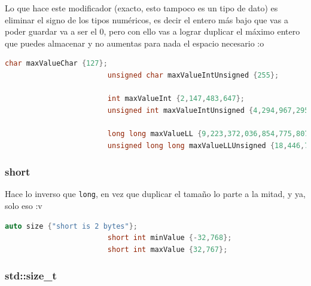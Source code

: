\documentclass[12pt, fleqn]{report}                             %
\theoremstyle{break}                                            %
\begin{document}
                    Lo que hace este modificador (exacto, esto tampoco es un tipo de dato)
                    es eliminar el signo de los tipos numéricos, es decir el entero más bajo que vas
                    a poder guardar va a ser el 0, pero con ello vas a lograr duplicar
                    el máximo entero que puedes almacenar y no aumentas para nada el espacio necesario :o
                    \begin{lstlisting}[language=C++, gobble=24]
                        char maxValueChar {127};                    
                        unsigned char maxValueIntUnsigned {255};
                        
                        int maxValueInt {2,147,483,647};                    
                        unsigned int maxValueIntUnsigned {4,294,967,295};
                        
                        long long maxValueLL {9,223,372,036,854,775,807};                    
                        unsigned long long maxValueLLUnsigned {18,446,744,073,709,551,615};
                    \end{lstlisting}


                \subsubsection{short}

                    Hace lo inverso que \texttt{long}, en vez que duplicar el tamaño lo parte a la mitad,
                    y ya, solo eso :v

                    \begin{lstlisting}[language=C++, gobble=24]
                        auto size {"short is 2 bytes"};
                        short int minValue {-32,768};
                        short int maxValue {32,767};
                    \end{lstlisting}
                
                \subsubsection{std::size\_t}
\end{document}
